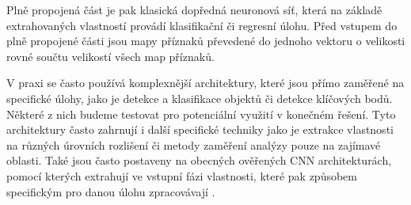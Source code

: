 Plně propojená část je pak klasická dopředná neuronová síť, která na základě
extrahovaných vlastností provádí klasifikační či regresní úlohu. Před vstupem
do plně propojené části jsou mapy příznaků převedené do jednoho vektoru o
velikosti rovné součtu velikostí všech map příznaků.

V praxi se často používá komplexnější architektury, které jsou přímo zaměřené
na specifické úlohy, jako je detekce a klasifikace objektů či detekce klíčových
bodů. Některé z nich budeme testovat pro potenciální využití v konečném řešení.
Tyto architektury často zahrnují i další specifické techniky jako je extrakce
vlastnosti na různých úrovních rozlišení či metody zaměření analýzy pouze na
zajímavé oblasti. Také jsou často postaveny na obecných ověřených CNN
architekturách, pomocí kterých extrahují ve vstupní fázi vlastnosti, které pak
způsobem specifickým pro danou úlohu zpracovávají \cite{cnnreview}.

\endinput
